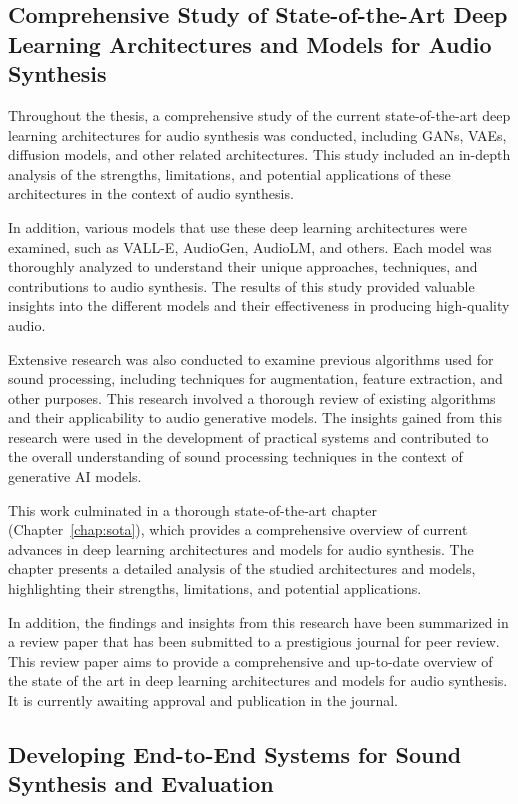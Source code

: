 \subsection{Comprehensive Study of State-of-the-Art Deep Learning Architectures and Models for Audio Synthesis}

Throughout the thesis, a comprehensive study of the current state-of-the-art deep learning architectures for audio synthesis was conducted, including \acp{GAN}, \acp{VAE}, diffusion models, and other related architectures. This study included an in-depth analysis of the strengths, limitations, and potential applications of these architectures in the context of audio synthesis.

In addition, various models that use these deep learning architectures were examined, such as VALL-E, AudioGen, AudioLM, and others. Each model was thoroughly analyzed to understand their unique approaches, techniques, and contributions to audio synthesis. The results of this study provided valuable insights into the different models and their effectiveness in producing high-quality audio.

Extensive research was also conducted to examine previous algorithms used for sound processing, including techniques for augmentation, feature extraction, and other purposes. This research involved a thorough review of existing algorithms and their applicability to audio generative models. The insights gained from this research were used in the development of practical systems and contributed to the overall understanding of sound processing techniques in the context of generative AI models.

This work culminated in a thorough state-of-the-art chapter (Chapter~\ref{chap:sota}), which provides a comprehensive overview of current advances in deep learning architectures and models for audio synthesis. The chapter presents a detailed analysis of the studied architectures and models, highlighting their strengths, limitations, and potential applications.

In addition, the findings and insights from this research have been summarized in a review paper that has been submitted to a prestigious journal for peer review. This review paper aims to provide a comprehensive and up-to-date overview of the state of the art in deep learning architectures and models for audio synthesis. It is currently awaiting approval and publication in the journal.

\subsection{Developing End-to-End Systems for Sound Synthesis and Evaluation}

